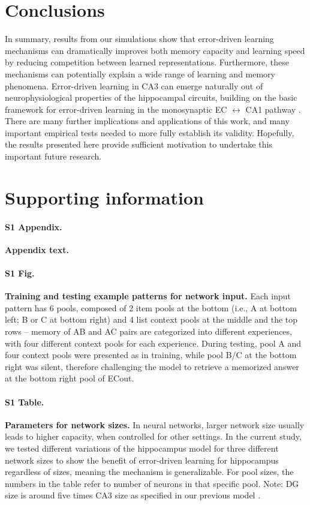 \documentclass[10pt,letterpaper]{article}
\begin{document}
\section*{Conclusions}

In summary, results from our simulations show that error-driven learning mechanisms can dramatically improves both memory capacity and learning speed by reducing competition between learned representations.  Furthermore, these mechanisms can potentially explain a wide range of learning and memory phenomena.  Error-driven learning in CA3 can emerge naturally out of neurophysiological properties of the hippocampal circuits, building on the basic framework for error-driven learning in the monosynaptic EC $\leftrightarrow$ CA1 pathway \cite{KetzMorkondaOReilly13}.  There are many further implications and applications of this work, and many important empirical tests needed to more fully establish its validity.  Hopefully, the results presented here provide sufficient motivation to undertake this important future research.




\section*{Supporting information}

\paragraph*{S1 Appendix.}
\label{S1_Appendix}
{\bf Appendix text.} 

\paragraph*{S1 Fig.}
\label{S1_Fig}
{\bf Training and testing example patterns for network input.}  Each input pattern has 6 pools, composed of 2 item pools at the bottom (i.e., A at bottom left; B or C at bottom right) and 4 list context pools at the middle and the top rows -- memory of AB and AC pairs are categorized into different experiences, with four different context pools for each experience.  During testing, pool A and four context pools were presented as in training, while pool B/C at the bottom right was silent, therefore challenging the model to retrieve a memorized answer at the bottom right pool of ECout.

\paragraph*{S1 Table.}
\label{S1_Table}
{\bf Parameters for network sizes.} In neural networks, larger network size usually leads to higher capacity, when controlled for other settings.  In the current study, we tested different variations of the hippocampus model for three different network sizes to show the benefit of error-driven learning for hippocampus regardless of sizes, meaning the mechanism is generalizable.  For pool sizes, the numbers in the table refer to number of neurons in that specific pool.  Note: DG size is around five times CA3 size as specified in our previous model \cite{KetzMorkondaOReilly13}.
\end{document}
